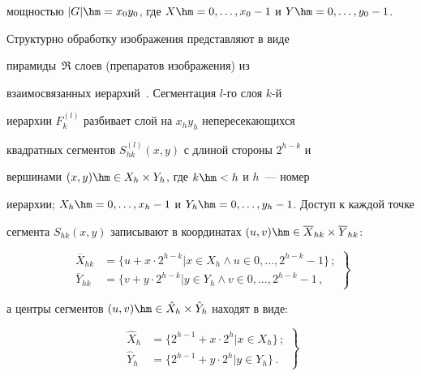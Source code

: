 мощностью $\vert G\vert \hm= x_0y_0$, где $X\hm=0, \ldots ,x_0-1$ и $Y\hm=0, \ldots ,y_0-1$. 


Структурно обработку изображения представляют в виде 


пирамиды~$\mathfrak{R}$ слоев (препаратов изображения) из 


взаимосвязанных иерархий~\cite{4-gk}. Сегментация $l$-го слоя $k$-й 


иерархии $F_k^{(l)}$ разбивает слой на $x_hy_h$ непересекающихся 


квадратных сегментов $S_{hk}^{(l)}(x,y)$ с длиной стороны $2^{h-k}$ и 


вершинами $(x,y)\hm\in X_h\times Y_h$, где $k\hm<h$ и $h$~--- номер 


иерархии; $X_h\hm=0, \ldots ,x_h-1$ и $Y_h\hm=0, \ldots ,y_h-1$. Доступ к каждой точке 


сегмента $S_{hk}(x,y)$ записывают в координатах $(u,v)\hm\in 


\overline{X}_{hk}\times \overline{Y}_{hk}$:


  \begin{equation}


  \left.


  \begin{array}{rl}


  \overline{X}_{hk} &=\{ u+x\cdot 2^{h-k}\vert x\in X_h\wedge u\in 0, \ldots ,2^{h-k}-


1\}\,;\\[9pt]


  \overline{Y}_{hk} &= \{ v+y \cdot 2^{h-k}\vert y\in Y_h\wedge v\in 0, \ldots ,2^{h-k}-1\,,


  \end{array}


  \right\}


  \label{e1-gk}


  \end{equation}


а центры сегментов $(u,v)\hm\in \hat{X}_h\times \hat{Y}_h$ находят в виде: 


\begin{equation}


\left.


\begin{array}{rl}


\hat{X}_h & = \{2^{h-1}+x\cdot 2^h\vert x\in X_h\}\,;\\[9pt]


\hat{Y}_h &= \{ 2^{h-1}+y\cdot  2^h\vert y\in Y_h\}\,.


\end{array}


\right\}


\label{e2-gk}


\end{equation}


